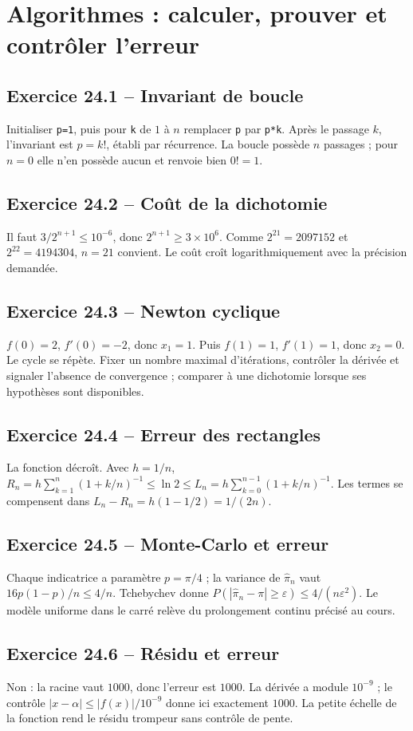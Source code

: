 \chapter{Algorithmes : calculer, prouver et contrôler l’erreur}
\section*{Exercice 24.1 -- Invariant de boucle}
Initialiser \texttt{p=1}, puis pour \texttt{k} de $1$ à $n$ remplacer \texttt{p} par \texttt{p*k}. Après le passage $k$, l'invariant est $p=k!$, établi par récurrence. La boucle possède $n$ passages ; pour $n=0$ elle n'en possède aucun et renvoie bien $0!=1$.

\section*{Exercice 24.2 -- Coût de la dichotomie}
Il faut $3/2^{n+1}\le10^{-6}$, donc $2^{n+1}\ge3\times10^6$. Comme $2^{21}=2097152$ et $2^{22}=4194304$, $n=21$ convient. Le coût croît logarithmiquement avec la précision demandée.

\section*{Exercice 24.3 -- Newton cyclique}
$f(0)=2$, $f'(0)=-2$, donc $x_1=1$. Puis $f(1)=1$, $f'(1)=1$, donc $x_2=0$. Le cycle se répète. Fixer un nombre maximal d'itérations, contrôler la dérivée et signaler l'absence de convergence ; comparer à une dichotomie lorsque ses hypothèses sont disponibles.

\section*{Exercice 24.4 -- Erreur des rectangles}
La fonction décroît. Avec $h=1/n$, $R_n=h\sum_{k=1}^n(1+k/n)^{-1}\le\ln2\le L_n=h\sum_{k=0}^{n-1}(1+k/n)^{-1}$. Les termes se compensent dans $L_n-R_n=h(1-1/2)=1/(2n)$.

\section*{Exercice 24.5 -- Monte-Carlo et erreur}
Chaque indicatrice a paramètre $p=\pi/4$ ; la variance de $\widehat\pi_n$ vaut $16p(1-p)/n\le4/n$. Tchebychev donne $P(|\widehat\pi_n-\pi|\ge\varepsilon)\le4/(n\varepsilon^2)$. Le modèle uniforme dans le carré relève du prolongement continu précisé au cours.

\section*{Exercice 24.6 -- Résidu et erreur}
Non : la racine vaut $1000$, donc l'erreur est $1000$. La dérivée a module $10^{-9}$ ; le contrôle $|x-\alpha|\le|f(x)|/10^{-9}$ donne ici exactement $1000$. La petite échelle de la fonction rend le résidu trompeur sans contrôle de pente.
